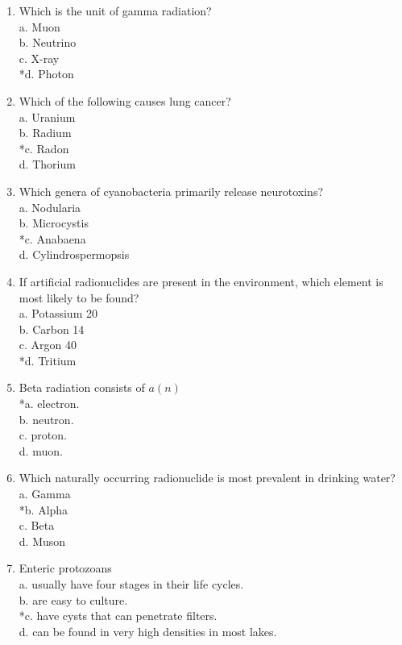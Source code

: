 \begin{enumerate}[1.]
  \item Which is the unit of gamma radiation?\\
a. Muon\\
b. Neutrino\\
c. X-ray\\
*d. Photon\\ 

  \item Which of the following causes lung cancer?\\
a. Uranium\\
b. Radium\\
*c. Radon\\
d. Thorium\\
  \item Which genera of cyanobacteria primarily release neurotoxins?\\
a. Nodularia\\
b. Microcystis\\
*c. Anabaena\\
d. Cylindrospermopsis\\

  \item If artificial radionuclides are present in the environment, which element is most likely to be found?\\
a. Potassium 20\\
b. Carbon 14\\
c. Argon 40\\
*d. Tritium\\

  \item Beta radiation consists of $a(n)$\\
*a. electron.\\
b. neutron.\\
c. proton.\\
d. muon.\\


  \item Which naturally occurring radionuclide is most prevalent in drinking water?\\
a. Gamma\\
*b. Alpha\\
c. Beta\\
d. Muson\\

  \item Enteric protozoans\\
a. usually have four stages in their life cycles.\\
b. are easy to culture.\\
*c. have cysts that can penetrate filters.\\
d. can be found in very high densities in most lakes.\\


\end{enumerate}
